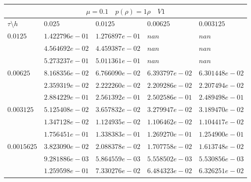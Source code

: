 \documentclass[a4paper,12pt]{extarticle}
\begin{document}
\begin{tabular}{|l|l|l|l|l|}
	\hline
	\multicolumn{5}{|c|}{$\mu =0.1 \quad  p(\rho) =1 \rho \quad V1$}\\
	\hline
	$\tau\setminus h$ & $0.025$ & $0.0125$ & $0.00625$ & $0.003125$\\
	\hline
	$0.0125$  & $1.422796e-01$ & $1.276897e-01$ & $nan$ & $nan$\\
	& $4.564692e-02$ & $4.459387e-02$ & $nan$ & $nan$\\
	& $5.273237e-01$ & $5.011361e-01$ & $nan$ & $nan$\\
	\hline
	$0.00625$  & $8.168356e-02$ & $6.766090e-02$ & $6.393797e-02$ & $6.301448e-02$\\
	& $2.359319e-02$ & $2.222260e-02$ & $2.209286e-02$ & $2.207494e-02$\\
	& $2.884229e-01$ & $2.561392e-01$ & $2.502586e-01$ & $2.489498e-01$\\
	\hline
	$0.003125$  & $5.125408e-02$ & $3.657832e-02$ & $3.279947e-02$ & $3.189470e-02$\\
	& $1.347128e-02$ & $1.124935e-02$ & $1.106462e-02$ & $1.104417e-02$\\
	& $1.756451e-01$ & $1.338383e-01$ & $1.269270e-01$ & $1.254900e-01$\\
	\hline
	$0.0015625$  & $3.823090e-02$ & $2.088378e-02$ & $1.707758e-02$ & $1.613748e-02$\\
	& $9.281886e-03$ & $5.864559e-03$ & $5.558502e-03$ & $5.530856e-03$\\
	& $1.259598e-01$ & $7.330276e-02$ & $6.484323e-02$ & $6.326251e-02$\\
	\hline
\end{tabular}
\end{document}
